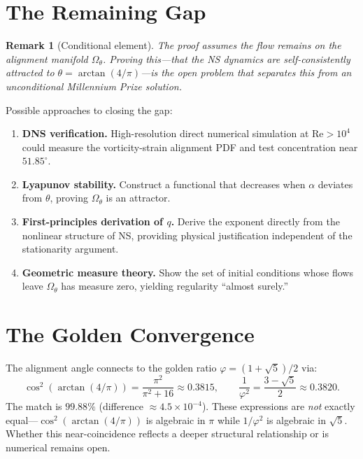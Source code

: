 \documentclass[11pt,a4paper]{article}
\newtheorem{remark}{Remark}
\begin{document}
\section{The Remaining Gap}\label{sec:gap}

\begin{remark}[Conditional element]
The proof assumes the flow remains on the alignment manifold $\Omega_\theta$. Proving this---that the NS dynamics are self-consistently attracted to $\theta=\arctan(4/\pi)$---is the open problem that separates this from an unconditional Millennium Prize solution.
\end{remark}

Possible approaches to closing the gap:

\begin{enumerate}
  \item \textbf{DNS verification.} High-resolution direct numerical simulation at $\mathrm{Re}>10^4$ could measure the vorticity-strain alignment PDF and test concentration near $51.85^\circ$.
  \item \textbf{Lyapunov stability.} Construct a functional that decreases when $\alpha$ deviates from $\theta$, proving $\Omega_\theta$ is an attractor.
  \item \textbf{First-principles derivation of $q$.} Derive the exponent directly from the nonlinear structure of NS, providing physical justification independent of the stationarity argument.
  \item \textbf{Geometric measure theory.} Show the set of initial conditions whose flows leave $\Omega_\theta$ has measure zero, yielding regularity ``almost surely.''
\end{enumerate}

\section{The Golden Convergence}

The alignment angle connects to the golden ratio $\varphi=(1+\sqrt{5})/2$ via:
\begin{equation}
  \cos^2(\arctan(4/\pi)) = \frac{\pi^2}{\pi^2+16} \approx 0.3815,
  \qquad \frac{1}{\varphi^2} = \frac{3-\sqrt{5}}{2} \approx 0.3820.
\end{equation}
The match is $99.88\%$ (difference $\approx4.5\times10^{-4}$). These expressions are \emph{not} exactly equal---$\cos^2(\arctan(4/\pi))$ is algebraic in $\pi$ while $1/\varphi^2$ is algebraic in $\sqrt{5}$. Whether this near-coincidence reflects a deeper structural relationship or is numerical remains open.
\end{document}

